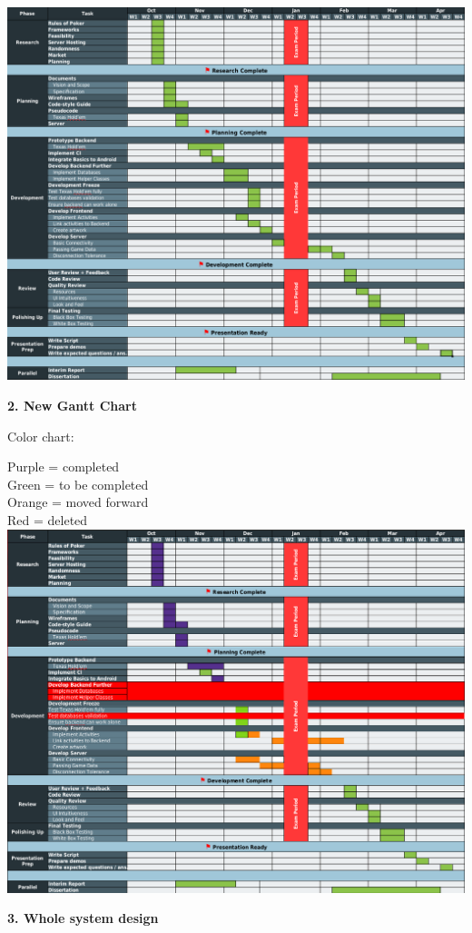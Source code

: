 \documentclass[11pt]{article}
\begin{document}
\includegraphics[width=\textwidth]{gantt_chart}

\newpage
\textbf{2. New Gantt Chart}

Color chart:

Purple = completed \\
Green  = to be completed\\
Orange = moved forward\\
Red = deleted\\

\includegraphics[width=\textwidth]{modified_gantt}


\newpage
\textbf{3. Whole system design}
\end{document}
